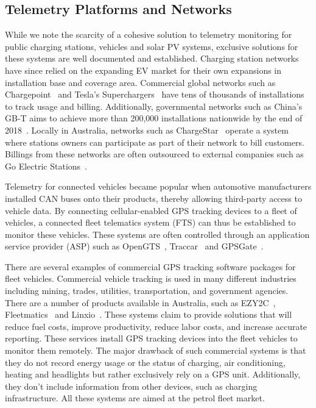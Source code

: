 \subsection{Telemetry Platforms and Networks}
While we note the scarcity of a cohesive solution to telemetry monitoring for public charging stations, vehicles and solar PV systems, exclusive solutions for these systems are well documented and established. Charging station networks have since relied on the expanding EV market for their own expansions in installation base and coverage area. Commercial global networks such as Chargepoint~\cite{chargepoint_inc_chargepoint_nodate} and Tesla’s Superchargers~\cite{tesla_supercharger_nodate} have tens of thousands of installations to track usage and billing. Additionally, governmental networks such as China’s GB-T aims to achieve more than 200,000 installations nationwide by the end of 2018~\cite{china_electric_vehicle_charging_infrastructure_promotion_alliance_zhongguo_2017}. Locally in Australia, networks such as ChargeStar~\cite{chargestar_chargestar_nodate} operate a system where stations owners can participate as part of their network to bill customers. Billings from these networks are often outsourced to external companies such as Go Electric Stations~\cite{go_electric_stations_s.r.l.s_go_nodate}.

Telemetry for connected vehicles became popular when automotive manufacturers installed CAN buses onto their products, thereby allowing third-party access to vehicle data.  By connecting cellular-enabled GPS tracking devices to a fleet of vehicles, a connected fleet telematics system (FTS) can thus be established to monitor these vehicles. These systems are often controlled through an application service provider (ASP) such as OpenGTS~\cite{geotelematic_solutions_inc._opengts_nodate}, Traccar~\cite{traccar_ltd_traccar_nodate} and GPSGate~\cite{gpsgate_ab_gpsgate_nodate}. 


There are several examples of commercial GPS tracking software packages for fleet vehicles. Commercial vehicle tracking is used in many different industries including mining, trades, utilities, transportation, and government agencies. There are a number of products available in Australia, such as EZY2C~\cite{netstar_ezy2c_nodate}, Fleetmatics~\cite{verizon_fleetmatics_nodate} and Linxio~\cite{linxio_linxio_nodate}. These systems claim to provide solutions that will reduce fuel costs, improve productivity, reduce labor costs, and increase accurate reporting. These services install GPS tracking devices into the fleet vehicles to monitor them remotely. The major drawback of such commercial systems is that they do not record energy usage or the status of charging, air conditioning, heating and headlights but rather exclusively rely on a GPS unit. Additionally, they don’t include information from other devices, such as charging infrastructure. All these systems are aimed at the petrol fleet market.

